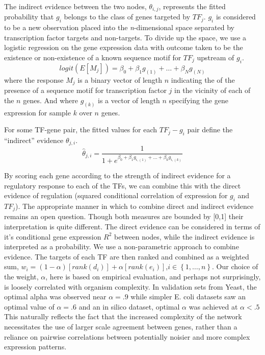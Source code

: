 \documentclass[english]{article}
\begin{document}
The indirect evidence between the two nodes, $\theta_{i,j}$, represents
the fitted probability that $g_{i}$ belongs to the class of genes
targeted by $TF_{j}$. $g_{i}$ is considered to be a new observation
placed into the \emph{n}-dimensional space separated by transcription
factor targets and non-targets. To divide up the space, we use a logistic
regression on the gene expression data with outcome taken to be the
existence or non-existence of a known sequence motif for $TF_{j}$
upstream of $g_{i}$. 
\[
logit\left(E\left[M_{j}\right]\right)=\beta_{0}+\beta_{1}g_{\left(1\right)}+\dots+\beta_{N}g_{\left(N\right)}
\]
where the response $M_{j}$ is a binary vector of length $n$ indicating
the of the presence of a sequence motif for transcription factor $j$
in the vicinity of each of the $n$ genes. And where $g_{\left(k\right)}$
is a vector of length $n$ specifying the gene expression for sample
$k$ over $n$ genes. 

For some TF-gene pair, the fitted values for each $TF_{j}-g_{i}$
pair define the ``indirect'' evidence $\theta_{j,i}$.
\[
\hat{\theta}_{j,i}=\frac{1}{1+e^{\beta_{0}+\beta_{1}g_{i,\left(1\right)}+\dots+\beta_{k}g_{i,\left(k\right)}}}
\]


By scoring each gene according to the strength of indirect evidence
for a regulatory response to each of the TFs, we can combine this
with the direct evidence of regulation (squared conditional correlation
of expression for $g_{i}$ and $TF_{j}$). The appropriate manner
in which to combine direct and indirect evidence remains an open question.
Though both measures are bounded by {[}0,1{]} their interpretation
is quite different. The direct evidence can be considered in terms
of it's conditional gene expression $R^{2}$ between nodes, while
the indirect evidence is interpreted as a probability. We use a non-parametric
approach to combine evidence. The targets of each TF are then ranked
and combined as a weighted sum, $w_{i}=\left(1-\alpha\right)\left[rank\left(d_{i}\right)\right]+\alpha\left[rank\left(e_{i}\right)\right]$,$i\in\left\{ 1,\dots,n\right\} $.
Our choice of the weight, $\alpha$, here is based on empirical evaluation,
and perhaps not surprisingly, is loosely correlated with organism
complexity. In validation sets from Yeast, the optimal alpha was observed
near $\alpha=.9$ while simpler E. coli datasets saw an optimal value
of $\alpha=.6$ and an in silico dataset, optimal $\alpha$ was achieved
at $\alpha<.5$ This naturally reflects the fact that the increased
complexity of the network necessitates the use of larger scale agreement
between genes, rather than a reliance on pairwise correlations between
potentially noisier and more complex expression patterns. 
\end{document}
